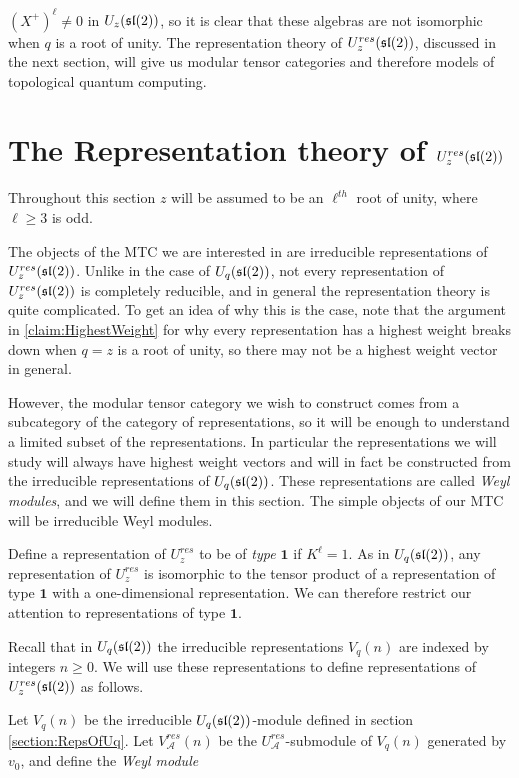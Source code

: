 $(X^+)^\ell \neq 0$ in $U_z(\mathfrak{sl}(2))$, so it is clear that these algebras are
not isomorphic when $q$ is a root of unity. The representation theory of
$U_z^{res}(\mathfrak{sl}(2))$, discussed in the next section, will give us modular
tensor categories and therefore models of topological quantum computing.

\section{The Representation theory of $U_z^{res}(\mathfrak{sl}(2))$}
\label{section:RepTheoryofResSL2}


Throughout this section $z$ will be assumed to be an $\ell^{th}$ root of unity, where $\ell \geq 3$ is odd.

The objects of the MTC we are interested in are irreducible representations of
$U_z^{res}(\mathfrak{sl}(2))$. Unlike in the case of $U_q(\mathfrak{sl}(2))$, not every
representation of $U_z^{res}(\mathfrak{sl}(2))$ is completely reducible, and in general
the representation theory is quite complicated. To get an idea of why this is
the case, note that the argument in \ref{claim:HighestWeight} for why every
representation has a highest weight breaks down when $q=z$ is a root of unity,
so there may not be a highest weight vector in general. 

However, the modular tensor category we wish to construct comes from a
subcategory of the category of representations, so it will be enough to
understand a limited subset of the representations.  In particular the
representations we will study will always have highest weight vectors and will
in fact be constructed from the irreducible representations of $U_q(\mathfrak{sl}(2))$.
These representations are called  \emph{Weyl modules}, and we will define them
in this section. The simple objects of our MTC will be irreducible Weyl modules. 

Define a representation of $U_z^{res}$ to be of \emph{type $\mathbf{1}$} if
$K^\ell = 1$. As in $U_q(\mathfrak{sl}(2))$, any representation of $U_z^{res}$ is
isomorphic to the tensor product of a representation of type $\mathbf{1}$ with
a one-dimensional representation. We can therefore restrict our attention to
representations of type $\mathbf{1}$. 

Recall that in $U_q(\mathfrak{sl}(2))$ the irreducible representations $V_q(n)$ are
indexed by integers $n \geq 0$. We will use these representations to define
representations of $U_z^{res}(\mathfrak{sl}(2))$ as follows.

Let $V_q(n)$ be the irreducible $U_q(\mathfrak{sl}(2))$-module defined in section
\ref{section:RepsOfUq}.  Let $V_\mathcal{A}^{res}(n)$ be the
$U_\mathcal{A}^{res}$-submodule of $V_q(n)$ generated by $v_0$, and define the
\emph{Weyl module}

